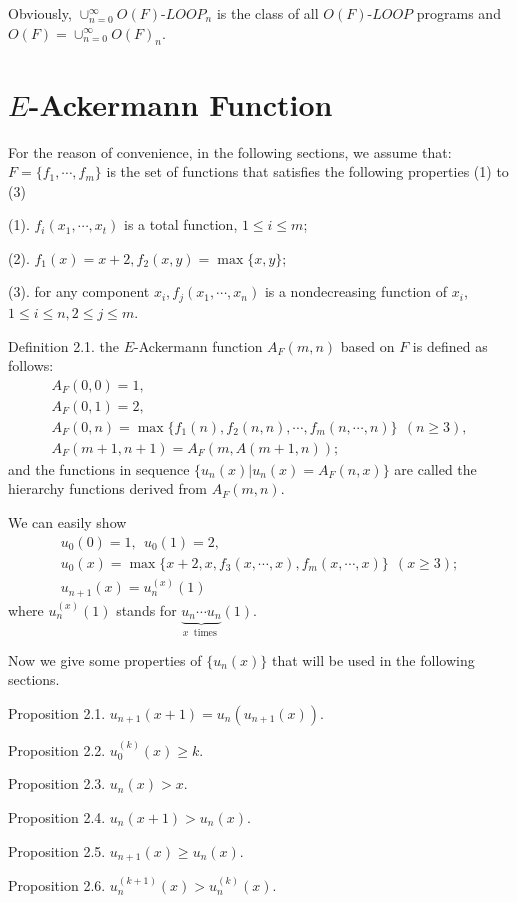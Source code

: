 Obviously, $\cup^\infty_{n=0}O(F)$-$LOOP_n$ is the class of all
$O(F)$-$LOOP$ programs and $O(F)=\cup^\infty_{n=0}O(F)_n$.
\vfill\pagebreak

\section{$E$-Ackermann Function}

For the reason of convenience, in the following sections, we
assume that: $F=\{f_1,\cdots,f_m\}$ is the set of 
functions that
satisfies the following properties (1) to (3)

(1). $f_i(x_1,\cdots,x_t)$ is a total function, 
$1\le i\le m$;

(2). $f_1(x)=x+2, f_2(x,y)=\max\{x,y\}$;

(3). for any component $x_i, f_j(x_1,\cdots,x_n)$ is
a nondecreasing function of $x_i$, $1\le i\le n, 2\le j\le m$.


Definition 2.1. the $E$-Ackermann function 
$A_F(m,n)$ based on 
$F$ is defined as follows:
$$\begin{array}{l}
A_F(0,0)=1,\\
A_F(0,1)=2,\\
A_F(0,n)=\max\{f_1(n),f_2(n,n),\cdots,f_m(n,\cdots,n)\}\ \ (n\ge 3),\\
A_F(m+1,n+1)=A_F(m,A(m+1,n));\end{array}$$
and the functions in sequence $\{u_n(x)|u_n(x)=A_F(n,x)\}$ are called
the hierarchy functions derived from $A_F(m,n)$.


We can easily show
$$\begin{array}{l} 
u_0(0)=1,\ \ u_0(1)=2,\\
u_0(x)=\max\{x+2,x,f_3(x,\cdots,x),f_m(x,\cdots,x)\}\ \ (x\ge 3);\\
u_{n+1}(x)=u^{(x)}_n(1)\end{array}$$
where $u^{(x)}_n(1)$ stands for $\underbrace{u_n\cdots u_n}_{x\
\mbox{ times }}(1)$.

Now we give some properties of $\{u_n(x)\}$ that will be used in 
the following sections.

Proposition 2.1. $u_{n+1}(x+1)=u_n(u_{n+1}(x))$.

Proposition 2.2. $u^{(k)}_0(x)\ge k$.

Proposition 2.3. $u_n(x)>x$.

Proposition 2.4. $u_n(x+1)>u_n(x)$.

Proposition 2.5. $u_{n+1}(x)\ge u_n(x)$.

Proposition 2.6. $u^{(k+1)}_n(x)>u^{(k)}_n(x)$.

